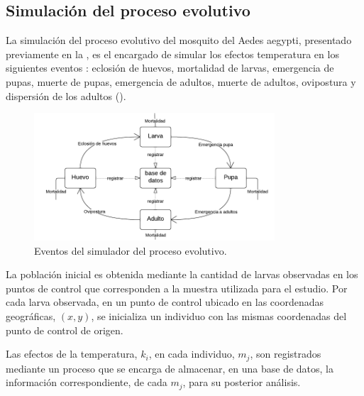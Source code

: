\subsection{Simulación del proceso evolutivo}
La simulación del proceso evolutivo del mosquito del Aedes aegypti, presentado previamente en la
, es el encargado de simular los efectos temperatura
en los siguientes eventos : eclosión de huevos, mortalidad de larvas, emergencia de pupas, muerte
de pupas, emergencia de adultos, muerte de adultos, ovipostura y dispersión de los adultos
().

\begin{figure}
\centering
\includegraphics[width=0.8\textwidth]{capitulo-5/graphics/proceso-evolutivo.png}
\caption{\label{fig:cap-5-proceso-evolutivo} Eventos del simulador del proceso evolutivo.}
\end{figure}

La población inicial es obtenida mediante la cantidad de larvas observadas en los puntos de
control que corresponden a la muestra utilizada para el estudio. Por cada larva observada,
en un punto de control ubicado en las coordenadas geográficas, $(x, y)$, se inicializa un individuo
con las mismas coordenadas del punto de control de origen.

Las efectos de la temperatura, $k_{i}$, en cada individuo, $m_{j}$, son registrados mediante un
proceso que se encarga de almacenar, en una base de datos, la información correspondiente, de cada
$m_{j}$, para su posterior análisis.
